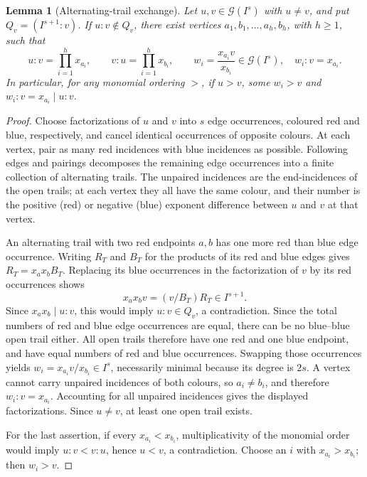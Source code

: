 \documentclass[11pt,a4paper]{article}
\newtheorem{lemma}[theorem]{Lemma}
\theoremstyle{remark}\newtheorem{remark}[theorem]{Remark}
\newcommand{\GG}{\mathcal G}
\begin{document}
\begin{lemma}[Alternating-trail exchange]\label{lem:exchange}
Let $u,v\in\GG(I^s)$ with $u\ne v$, and put $Q_v=(I^{s+1}:v)$. If $u:v\notin Q_v$, there exist vertices $a_1,b_1,\dots,a_h,b_h$, with $h\ge1$, such that
\[
 u:v=\prod_{i=1}^h x_{a_i},\qquad v:u=\prod_{i=1}^h x_{b_i},
 \qquad w_i=\frac{x_{a_i}v}{x_{b_i}}\in\GG(I^s),\quad w_i:v=x_{a_i}.
\]
In particular, for any monomial ordering $>$, if $u>v$, some $w_i>v$ and $w_i:v=x_{a_i}\mid u:v$.
\end{lemma}
\begin{proof}
Choose factorizations of $u$ and $v$ into $s$ edge occurrences, coloured red and blue, respectively, and cancel identical occurrences of opposite colours. At each vertex, pair as many red incidences with blue incidences as possible. Following edges and pairings decomposes the remaining edge occurrences into a finite collection of alternating trails. The unpaired incidences are the end-incidences of the open trails; at each vertex they all have the same colour, and their number is the positive (red) or negative (blue) exponent difference between $u$ and $v$ at that vertex.

An alternating trail with two red endpoints $a,b$ has one more red than blue edge occurrence. Writing $R_T$ and $B_T$ for the products of its red and blue edges gives $R_T=x_ax_bB_T$. Replacing its blue occurrences in the factorization of $v$ by its red occurrences shows
\[
 x_ax_bv=(v/B_T)R_T\in I^{s+1}.
\]
Since $x_ax_b\mid u:v$, this would imply $u:v\in Q_v$, a contradiction. Since the total numbers of red and blue edge occurrences are equal, there can be no blue--blue open trail either. All open trails therefore have one red and one blue endpoint, and have equal numbers of red and blue occurrences. Swapping those occurrences yields $w_i=x_{a_i}v/x_{b_i}\in I^s$, necessarily minimal because its degree is $2s$. A vertex cannot carry unpaired incidences of both colours, so $a_i\ne b_i$, and therefore $w_i:v=x_{a_i}$. Accounting for all unpaired incidences gives the displayed factorizations. Since $u\ne v$, at least one open trail exists.

For the last assertion, if every $x_{a_i}<x_{b_i}$, multiplicativity of the monomial order would imply $u:v<v:u$, hence $u<v$, a contradiction. Choose an $i$ with $x_{a_i}>x_{b_i}$; then $w_i>v$.
\end{proof}
\end{document}
